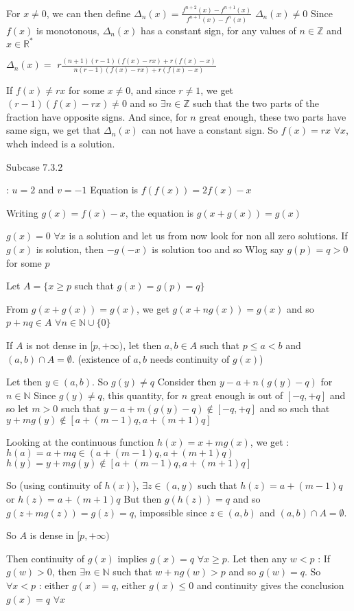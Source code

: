\begin{solution}
For $x\ne 0$, we can then define $\Delta_n(x)=\frac{f^{n+2}(x)-f^{n+1}(x)}{f^{n+1}(x)-f^{n}(x)}$
$\Delta_n(x)\ne 0$
Since $f(x)$ is monotonous, $\Delta_n(x)$ has a constant sign, for any values of $n\in\mathbb Z$ and $x\in\mathbb R^*$

$\Delta_n(x)=$ $r\frac{(n+1)(r-1)(f(x)-rx)+r(f(x)-x)}{n(r-1)(f(x)-rx)+r(f(x)-x)}$

If $f(x)\ne rx$ for some $x\ne 0$, and since $r\ne 1$, we get $(r-1)(f(x)-rx)\ne 0$ and so $\exists n\in\mathbb Z$ such that the two parts of the fraction have opposite signs.
And since, for $n$ great enough, these two parts have same sign, we get that $\Delta_n(x)$ can not have a constant sign.
So $f(x)=rx$ $\forall x$, whch indeed is a solution.

\begin{bolded}Subcase 7.3.2\end{bolded} : $u=2$ and $v=-1$
Equation is $f(f(x))=2f(x)-x$

Writing $g(x)=f(x)-x$, the equation is $g(x+g(x))=g(x)$

$g(x)=0$ $\forall x$ is a solution and let us from now look for non all zero solutions.
If $g(x)$ is solution, then $-g(-x)$ is solution too and so Wlog say $g(p)=q>0$ for some $p$

Let $A=\{x\ge p$ such that $g(x)=g(p)=q\}$

From $g(x+g(x))=g(x)$, we get $g(x+ng(x))=g(x)$ and so $p+nq\in A$ $\forall n\in\mathbb N\cup\{0\}$

If $A$ is not dense in $[p,+\infty)$, let then $a,b\in A$ such that $p\le a<b$ and $(a,b)\cap A=\emptyset$. (existence of $a,b$ needs continuity of $g(x)$)

Let then $y\in(a,b)$. So $g(y)\ne q$ 
Consider then $y-a+n(g(y)-q)$ for $n\in\mathbb N$
Since $g(y)\ne q$, this quantity, for $n$ great enough is out of $[-q,+q]$ and so let $m>0$ such that $y-a+m(g(y)-q)\notin[-q,+q]$ and so such that $y+mg(y)\notin[a+(m-1)q,a+(m+1)q]$

Looking at the continuous function $h(x)=x+mg(x)$, we get :
$h(a)=a+mq\in(a+(m-1)q,a+(m+1)q)$
$h(y)=y+mg(y)\notin[a+(m-1)q,a+(m+1)q]$

So (using continuity of $h(x)$), $\exists z\in(a,y)$ such that $h(z)=a+(m-1)q$ or $h(z)=a+(m+1)q$
But then $g(h(z))=q$ and so $g(z+mg(z))=g(z)=q$, impossible since $z\in(a,b)$ and $(a,b)\cap A=\emptyset$.

So $A$ is dense in $[p,+\infty)$

Then continuity of $g(x)$ implies $g(x)=q$ $\forall x\ge p$.
Let then any $w<p$ : If $g(w)>0$, then $\exists n\in\mathbb N$ such that $w+ng(w)>p$ and so $g(w)=q$. So $\forall x<p$ : either $g(x)=q$, either $g(x)\le 0$ and continuity gives the conclusion $g(x)=q$ $\forall x$


\end{solution}
